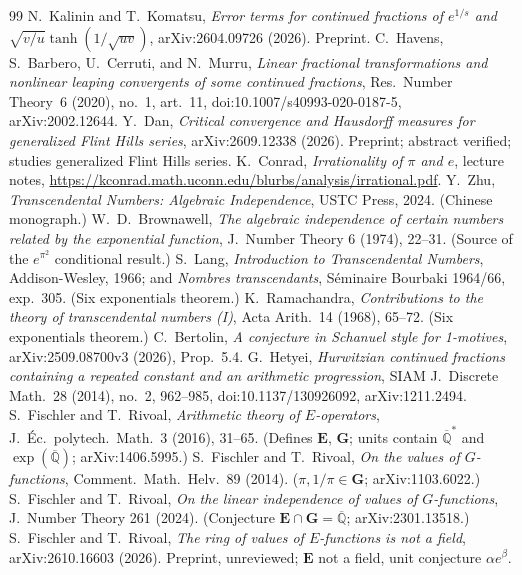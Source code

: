 \documentclass[11pt]{amsart}
\theoremstyle{definition}
\theoremstyle{remark}
\numberwithin{equation}{section}
\newcommand{\Q}{\mathbb{Q}}
\newcommand{\ee}{e}
\begin{document}
\begin{thebibliography}{99}
 N.~Kalinin and T.~Komatsu, \emph{Error terms for continued fractions of $e^{1/s}$ and $\sqrt{v/u}\tanh(1/\sqrt{uv})$}, arXiv:2604.09726 (2026). Preprint.
 C.~Havens, S.~Barbero, U.~Cerruti, and N.~Murru, \emph{Linear fractional transformations and nonlinear leaping convergents of some continued fractions}, Res.~Number Theory~6 (2020), no.~1, art.~11, doi:10.1007/s40993-020-0187-5, arXiv:2002.12644.
 Y.~Dan, \emph{Critical convergence and Hausdorff measures for generalized Flint Hills series}, arXiv:2609.12338 (2026). Preprint; abstract verified; studies generalized Flint Hills series.
 K.~Conrad, \emph{Irrationality of $\pi$ and $e$}, lecture notes, \url{https://kconrad.math.uconn.edu/blurbs/analysis/irrational.pdf}.
 Y.~Zhu, \emph{Transcendental Numbers: Algebraic Independence}, USTC Press, 2024. (Chinese monograph.)
 W.~D.~Brownawell, \emph{The algebraic independence of certain numbers related by the exponential function}, J.~Number Theory 6 (1974), 22--31. (Source of the $\ee^{\pi^2}$ conditional result.)
 S.~Lang, \emph{Introduction to Transcendental Numbers}, Addison-Wesley, 1966; and \emph{Nombres transcendants}, S\'eminaire Bourbaki 1964/66, exp.~305. (Six exponentials theorem.)
 K.~Ramachandra, \emph{Contributions to the theory of transcendental numbers (I)}, Acta Arith.~14 (1968), 65--72. (Six exponentials theorem.)
 C.~Bertolin, \emph{A conjecture in Schanuel style for 1-motives}, arXiv:2509.08700v3 (2026), Prop.~5.4.
 G.~Hetyei, \emph{Hurwitzian continued fractions containing a repeated constant and an arithmetic progression}, SIAM J.~Discrete Math.~28 (2014), no.~2, 962--985, doi:10.1137/130926092, arXiv:1211.2494.
 S.~Fischler and T.~Rivoal, \emph{Arithmetic theory of $E$-operators}, J.~\'Ec.~polytech.~Math.~3 (2016), 31--65. (Defines $\mathbf{E}$, $\mathbf{G}$; units contain $\overline{\Q}^*$ and $\exp(\overline{\Q})$; arXiv:1406.5995.)
 S.~Fischler and T.~Rivoal, \emph{On the values of $G$-functions}, Comment.~Math.~Helv.~89 (2014). ($\pi,1/\pi\in\mathbf{G}$; arXiv:1103.6022.)
 S.~Fischler and T.~Rivoal, \emph{On the linear independence of values of $G$-functions}, J.~Number Theory 261 (2024). (Conjecture $\mathbf{E}\cap\mathbf{G}=\overline{\Q}$; arXiv:2301.13518.)
 S.~Fischler and T.~Rivoal, \emph{The ring of values of $E$-functions is not a field}, arXiv:2610.16603 (2026). Preprint, unreviewed; $\mathbf{E}$ not a field, unit conjecture $\alpha e^\beta$.

\end{thebibliography}
\end{document}
